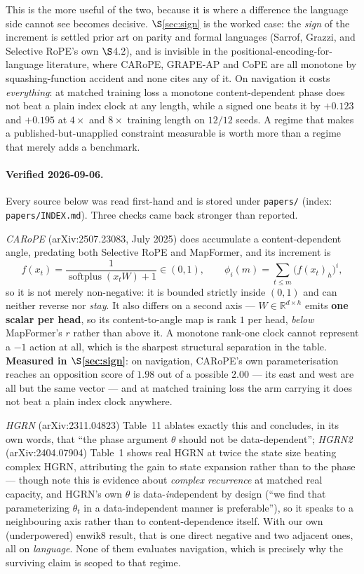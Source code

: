 \documentclass[11pt]{article}
\newcommand{\R}{\mathbb{R}}
\begin{document}
\begin{itemize}
  This is the more useful of the two, because it is where a difference the language
  side cannot see becomes decisive. $\S$\ref{sec:sign} is the worked case: the
  \emph{sign} of the increment is settled prior art on parity and formal languages
  (Sarrof, Grazzi, and Selective RoPE's own $\S$4.2), and is invisible in the
  positional-encoding-for-language literature, where CARoPE, GRAPE-AP and CoPE are
  all monotone by squashing-function accident and none cites any of it. On
  navigation it costs \emph{everything}: at matched training loss a monotone
  content-dependent phase does not beat a plain index clock at any length, while a
  signed one beats it by $+0.123$ and $+0.195$ at $4\times$ and $8\times$ training
  length on $12/12$ seeds. A regime that makes a published-but-unapplied constraint
  measurable is worth more than a regime that merely adds a benchmark.
\end{itemize}
\paragraph{Verified 2026-09-06.} Every source below was read first-hand and is
stored under \texttt{papers/} (index: \texttt{papers/INDEX.md}). Three checks
came back stronger than reported.

\emph{CARoPE} (arXiv:2507.23083, July 2025) does accumulate a content-dependent
angle, predating both Selective RoPE and MapFormer, and its increment is
\[
f(x_t)=\frac{1}{\operatorname{softplus}(x_tW)+1}\in(0,1),
\qquad \phi_i(m)=\sum_{t\le m} \big(f(x_t)_h\big)^{i} ,
\]
so it is not merely non-negative: it is bounded strictly inside $(0,1)$ and can
neither reverse nor \emph{stay}. It also differs on a second axis --- $W\in\R^{d\times h}$
emits \textbf{one scalar per head}, so its content-to-angle map is rank $1$ per
head, \emph{below} MapFormer's $r$ rather than above it. A monotone rank-one clock
cannot represent a $-1$ action at all, which is the sharpest structural separation
in the table. \textbf{Measured in $\S$\ref{sec:sign}}: on navigation, CARoPE's own
parameterisation reaches an opposition score of $1.98$ out of a possible $2.00$ ---
its east and west are all but the same vector --- and at matched training loss the
arm carrying it does not beat a plain index clock anywhere.

\emph{HGRN} (arXiv:2311.04823) Table~11 ablates exactly this and concludes, in its
own words, that ``the phase argument $\theta$ should not be data-dependent'';
\emph{HGRN2} (arXiv:2404.07904) Table~1 shows real HGRN at twice the state size
beating complex HGRN, attributing the gain to state expansion rather than to the
phase --- though note this is evidence about \emph{complex recurrence} at matched
real capacity, and HGRN's own $\theta$ is data-\emph{in}dependent by design (``we
find that parameterizing $\theta_t$ in a data-independent manner is preferable''),
so it speaks to a neighbouring axis rather than to content-dependence itself.
With our own (underpowered) enwik8 result, that is one direct negative and two
adjacent ones, all on \emph{language}. None of them evaluates navigation,
which is precisely why the surviving claim is scoped to that regime.
\end{document}
